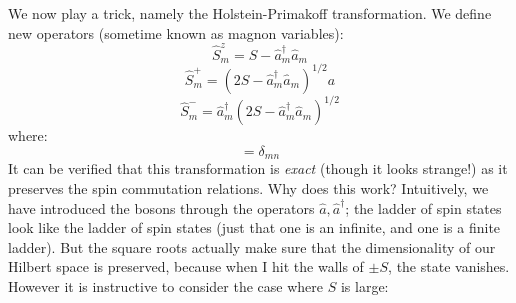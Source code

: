 We now play a trick, namely the Holstein-Primakoff transformation. We define new operators (sometime known as magnon variables):
\begin{equation}
    \hat{S}^z_m = S - \hat{a}^\dag_m \hat{a}_m
\end{equation}
\begin{equation}
    \hat{S}^+_m = \left(2S - \hat{a}^\dag_m \hat{a}_m\right)^{1/2}a
\end{equation}
\begin{equation}
    \hat{S}^-_m = \hat{a}^\dag_m \left(2S - \hat{a}^\dag_m \hat{a}_m\right)^{1/2}
\end{equation}
where:
\begin{equation}
    [\hat{a}_m, \hat{a}_n^\dag] = \delta_{mn}
\end{equation}
It can be verified that this transformation is \emph{exact} (though it looks strange!) as it preserves the spin commutation relations. Why does this work? Intuitively, we have introduced the bosons through the operators $\hat{a}, \hat{a}^\dag$; the ladder of spin states look like the ladder of spin states (just that one is an infinite, and one is a finite ladder). But the square roots actually make sure that the dimensionality of our Hilbert space is preserved, because when I hit the walls of $\pm S$, the state vanishes. However it is instructive to consider the case where $S$ is large:


